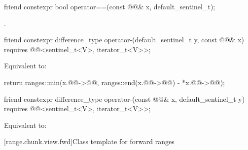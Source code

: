 \begin{itemdecl}
friend constexpr bool operator==(const @@& x, default_sentinel_t);
\end{itemdecl}

\begin{itemdescr}
\pnum
\returns
{}.
\end{itemdescr}

\begin{itemdecl}
friend constexpr difference_type operator-(default_sentinel_t y, const @@& x)
  requires @@<sentinel_t<V>, iterator_t<V>>;
\end{itemdecl}

\begin{itemdescr}
\pnum
\effects
Equivalent to:
\begin{codeblock}
return ranges::min(x.@@->@@,
                   ranges::end(x.@@->@@) - *x.@@->@@);
\end{codeblock}
\end{itemdescr}

\begin{itemdecl}
friend constexpr difference_type operator-(const @@& x, default_sentinel_t y)
  requires @@<sentinel_t<V>, iterator_t<V>>;
\end{itemdecl}

\begin{itemdescr}
\pnum
\effects
Equivalent to: 
\end{itemdescr}

[range.chunk.view.fwd]{Class template  for forward ranges}

